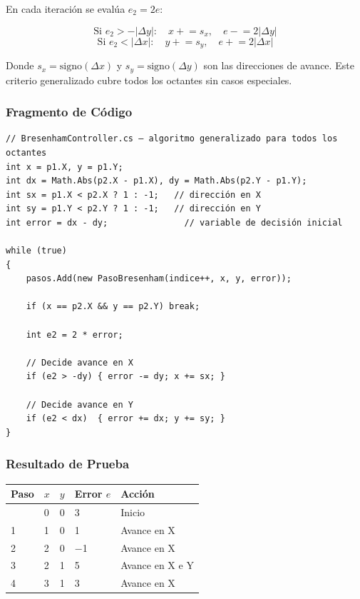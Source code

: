 \documentclass[
  spanish,
  a4paper,
  12pt,
]{article}
\newcounter{none} %
\begin{document}
En cada iteración se evalúa \(e_2 = 2e\):

\[\text{Si } e_2 > -|\Delta y|: \quad x \mathrel{+}= s_x, \quad e \mathrel{-}= 2|\Delta y|\]
\[\text{Si } e_2 < |\Delta x|: \quad y \mathrel{+}= s_y, \quad e \mathrel{+}= 2|\Delta x|\]

Donde \(s_x = \text{signo}(\Delta x)\) y
\(s_y = \text{signo}(\Delta y)\) son las direcciones de avance. Este
criterio generalizado cubre todos los octantes sin casos especiales.

\newpage

\subsubsection{Fragmento de Código}\label{fragmento-de-cuxf3digo-1}

\begin{lstlisting}
// BresenhamController.cs — algoritmo generalizado para todos los octantes
int x = p1.X, y = p1.Y;
int dx = Math.Abs(p2.X - p1.X), dy = Math.Abs(p2.Y - p1.Y);
int sx = p1.X < p2.X ? 1 : -1;   // dirección en X
int sy = p1.Y < p2.Y ? 1 : -1;   // dirección en Y
int error = dx - dy;               // variable de decisión inicial

while (true)
{
    pasos.Add(new PasoBresenham(indice++, x, y, error));

    if (x == p2.X && y == p2.Y) break;

    int e2 = 2 * error;

    // Decide avance en X
    if (e2 > -dy) { error -= dy; x += sx; }

    // Decide avance en Y
    if (e2 < dx)  { error += dx; y += sy; }
}
\end{lstlisting}


\subsubsection{Resultado de Prueba}\label{resultado-de-prueba-1}

{\def\LTcaptype{none} %
\begin{longtable}[]{@{}lllll@{}}
\toprule\noalign{}
Paso & \(x\) & \(y\) & Error \(e\) & Acción \\
\midrule\noalign{}
\endhead
\bottomrule\noalign{}
\endlastfoot
0 & 0 & 0 & 3 & Inicio \\
1 & 1 & 0 & 1 & Avance en X \\
2 & 2 & 0 & −1 & Avance en X \\
3 & 2 & 1 & 5 & Avance en X e Y \\
4 & 3 & 1 & 3 & Avance en X \\
\end{longtable}
}
\end{document}
